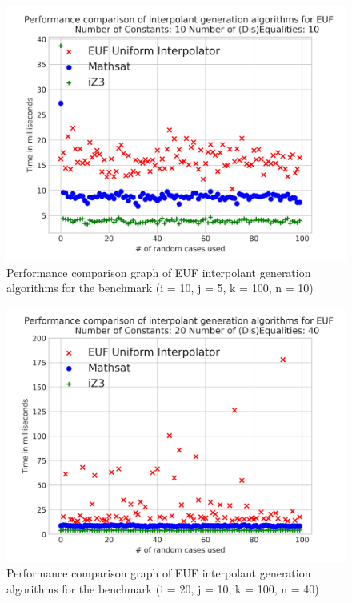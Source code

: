 \begin{figure}
  \centering
  \includegraphics[scale=0.9]{figures/eufi_performance_graph_10_5_3_10_100}
  \caption{Performance comparison graph of EUF interpolant generation
  algorithms for the benchmark (i = 10, j = 5, k = 100, n = 10)}
  \label{performance_graph_euf}
\end{figure}

\begin{figure}
  \centering
  \includegraphics[scale=0.9]{figures/eufi_performance_graph_20_10_3_40_100}
  \caption{Performance comparison graph of EUF interpolant generation
  algorithms for the benchmark (i = 20, j = 10, k = 100, n = 40)} 

  \label{performance_graph_euf_2}
\end{figure}


